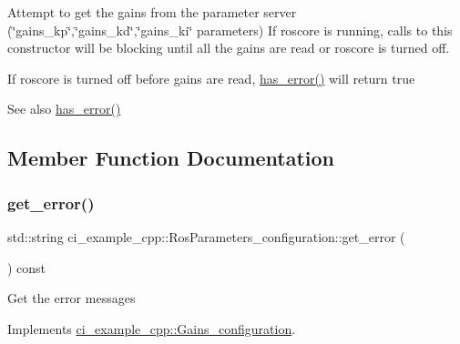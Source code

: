 Attempt to get the gains from the parameter server (\char`\"{}gains\+\_\+kp\char`\"{},\char`\"{}gains\+\_\+kd\char`\"{},\char`\"{}gains\+\_\+ki\char`\"{} parameters) If roscore is running, calls to this constructor will be blocking until all the gains are read or roscore is turned off. 

If roscore is turned off before gains are read, \hyperlink{classci__example__cpp_1_1RosParameters__configuration_afcf30b3c93eb3d215d8dfb852eaaae52}{has\+\_\+error()} will return true \begin{DoxySeeAlso}{See also}
\hyperlink{classci__example__cpp_1_1RosParameters__configuration_afcf30b3c93eb3d215d8dfb852eaaae52}{has\+\_\+error()} 
\end{DoxySeeAlso}


\subsection{Member Function Documentation}
\mbox{\label{classci__example__cpp_1_1RosParameters__configuration_aa6c44530007d18df221b22b84abcedea}} 
\subsubsection{\texorpdfstring{get\+\_\+error()}{get\_error()}}
{\footnotesize\ttfamily std\+::string ci\+\_\+example\+\_\+cpp\+::\+Ros\+Parameters\+\_\+configuration\+::get\+\_\+error (\begin{DoxyParamCaption}{ }\end{DoxyParamCaption}) const\hspace{0.3cm}{\ttfamily [virtual]}}

Get the error messages 

Implements \hyperlink{classci__example__cpp_1_1Gains__configuration_a886100ef46082d1b9f8ee169318dc554}{ci\+\_\+example\+\_\+cpp\+::\+Gains\+\_\+configuration}.

\mbox{\label{classci__example__cpp_1_1RosParameters__configuration_a01be945f19c9fc4734f28460a335e731}} 
